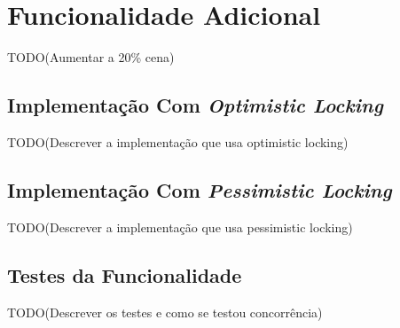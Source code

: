 %
%
\section{Funcionalidade Adicional} \label{sec33}

TODO(Aumentar a 20\% cena)

%
%
\subsection{Implementação Com \textit{Optimistic Locking}} \label{sec331}

TODO(Descrever a implementação que usa optimistic locking)

%
%
\subsection{Implementação Com \textit{Pessimistic Locking}} \label{sec332}

TODO(Descrever a implementação que usa pessimistic locking)

%
%
\subsection{Testes da Funcionalidade}\label{sec333}

TODO(Descrever os testes e como se testou concorrência)